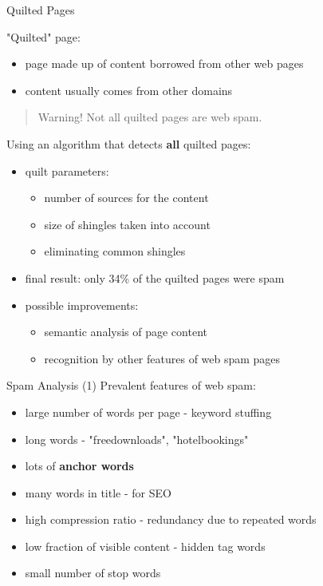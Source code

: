 \begin{frame}{Quilted Pages}

"Quilted" page:
\begin{itemize}
	\item page made up of content borrowed from other web pages
	\item content usually comes from other domains
\end{itemize}

\begin{quote}
	Warning! Not all quilted pages are web spam.
\end{quote}

Using an algorithm that detects \textbf{all} quilted pages:
\begin{itemize}

\item quilt parameters:
\begin{itemize}
	\item number of sources for the content
	\item size of shingles taken into account
	\item eliminating common shingles
\end{itemize}

\item final result: only 34\% of the quilted pages were spam 

\item possible improvements:
\begin{itemize}
	\item semantic analysis of page content
	\item recognition by other features of web spam pages
\end{itemize}

\end{itemize}

\end{frame}

\begin{frame}{Spam Analysis (1)}
Prevalent features of web spam:
\begin{itemize}
	\item large number of words per page - keyword stuffing
	\item long words - "freedownloads", "hotelbookings"
	\item lots of \textbf{anchor words}
	\item many words in title - for SEO %
	\item high compression ratio - redundancy due to repeated words %
	\item low fraction of visible content - hidden tag words  %
	\item small number of stop words %
\end{itemize}
\end{frame}

